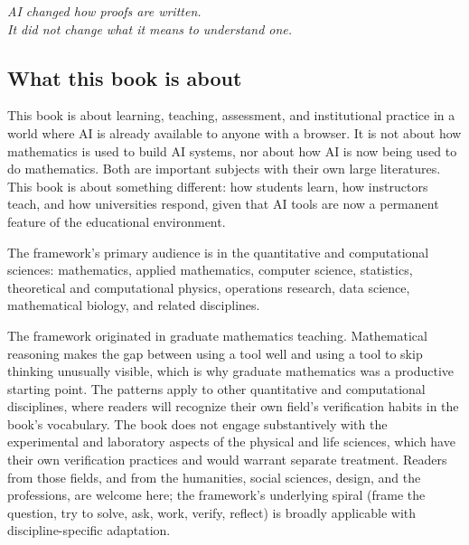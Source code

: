 \documentclass{SIAMbook2023}
\newcommand{\bookepigraph}[1]{%
  \begin{center}%
    \begin{minipage}{0.78\textwidth}%
      \centering\itshape #1%
    \end{minipage}%
  \end{center}%
  \vspace{0.6em}%
}
\begin{document}
\newpage


\begin{thepreface}
\label{sec:foreword}

\bookepigraph{AI changed how proofs are written.\\It did not change what it means to understand one.}

\subsection*{What this book is about}

This book is about learning, teaching, assessment, and institutional practice in a world where AI is already available to anyone with a browser. It is not about how mathematics is used to build AI systems, nor about how AI is now being used to do mathematics. Both are important subjects with their own large literatures. This book is about something different: how students learn, how instructors teach, and how universities respond, given that AI tools are now a permanent feature of the educational environment.

The framework's primary audience is in the quantitative and computational sciences: mathematics, applied mathematics, computer science, statistics, theoretical and computational physics, operations research, data science, mathematical biology, and related disciplines.

The framework originated in graduate mathematics teaching. Mathematical reasoning makes the gap between using a tool well and using a tool to skip thinking unusually visible, which is why graduate mathematics was a productive starting point. The patterns apply to other quantitative and computational disciplines, where readers will recognize their own field's verification habits in the book's vocabulary. The book does not engage substantively with the experimental and laboratory aspects of the physical and life sciences, which have their own verification practices and would warrant separate treatment. Readers from those fields, and from the humanities, social sciences, design, and the professions, are welcome here; the framework's underlying spiral (frame the question, try to solve, ask, work, verify, reflect) is broadly applicable with discipline-specific adaptation.


\end{thepreface}
\end{document}
